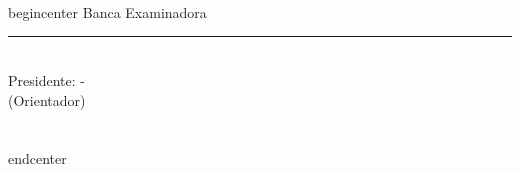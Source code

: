 \begin{titlepage}
  \autor \\
  \titulo \\
  \subtitulo \\
  \natureza
  begin{center}
  Banca Examinadora \\
  \rule{\textwidth}{0.1pt}\\
  \centering
  Presidente: \orientador - \instituicaoorientador\\
  (Orientador)\\
  \local \\
  \data \\
  end{center}
\end{titlepage}
